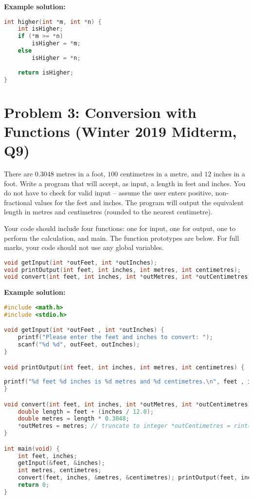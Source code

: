 \documentclass[12pt]{article}
\begin{document}
\textbf{Example solution:}
\begin{lstlisting}[language=C]
int higher(int *m, int *n) { 
	int isHigher;
	if (*m >= *n) 
		isHigher = *m;
	else
		isHigher = *n; 
		
	return isHigher;
}
\end{lstlisting}

\section*{Problem 3: Conversion with Functions (Winter 2019 Midterm, Q9)}
There are $0.3048$ metres in a foot, $100$ centimetres in a metre, and $12$ inches in a foot. Write a program that will accept, as input, a length in feet and inches. You do not have to check for valid input – assume the user enters positive, non-fractional values for the feet and inches. The program will output the equivalent length in metres and centimetres (rounded to the nearest centimetre).

Your code should include four functions: one for input, one for output, one to perform the calculation, and main. The function prototypes are below. For full marks, your code should not use any global variables.

\begin{lstlisting}[language=C]
void getInput(int *outFeet, int *outInches);
void printOutput(int feet, int inches, int metres, int centimetres); 
void convert(int feet, int inches, int *outMetres, int *outCentimetres);
\end{lstlisting}

\textbf{Example solution:}
\begin{lstlisting}[language=C]
#include <math.h> 
#include <stdio.h>

void getInput(int *outFeet , int *outInches) {
	printf("Please enter the feet and inches to convert: "); 
	scanf("%d %d", outFeet, outInches);
}

void printOutput(int feet, int inches, int metres, int centimetres) {
	
printf("%d feet %d inches is %d metres and %d centimetres.\n", feet , inches , metres , centimetres );
}

void convert(int feet, int inches, int *outMetres, int *outCentimetres) { 
	double length = feet + (inches / 12.0);
	double metres = length * 0.3048;
	*outMetres = metres; // truncate to integer *outCentimetres = rint((metres - *outMetres) * 100);
}

int main(void) {
	int feet, inches;
	getInput(&feet, &inches);
	int metres, centimetres;
	convert(feet, inches, &metres, &centimetres); printOutput(feet, inches, metres, centimetres); 
	return 0;
}
\end{lstlisting}
\end{document}
